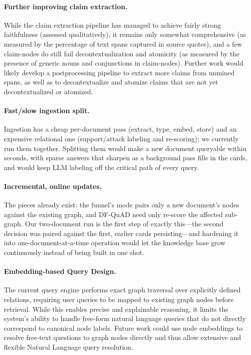 \documentclass{article}
\newcommand{\flag}[1]{\texttt{\seqsplit{#1}}}
\begin{document}
\paragraph{Further improving claim extraction.}
While the claim extraction pipeline has managed to achieve fairly strong faithfulness (assessed qualitatively), it remains only somewhat comprehensive (as measured by the percentage of text spans captured in source quotes), and a few claim-nodes do still fail decontextualization and atomicity (as measured by the presence of generic nouns and conjunctions in claim-nodes). Further work would likely develop a postprocessing pipeline to extract more claims from unmined spans, as well as to decontextualize and atomize claims that are not yet decontextualized or atomized.
\paragraph{Fast/slow ingestion split.}
Ingestion has a cheap per-document pass (extract, type, embed, store) and an
expensive relational one (support/attack labeling and re-scoring); we
currently run them together. Splitting them would make a new document
queryable within seconds, with sparse answers that sharpen as a background
pass fills in the cards, and would keep LLM labeling off the critical path of
every query.
\paragraph{Incremental, online updates.}
The pieces already exist: the funnel's \flag{--new-nodes} mode pairs only
a new document's nodes against the existing graph, and DF-QuAD need only
re-score the affected sub-graph. Our two-document run is the first step of
exactly this---the second decision was paired against the first, earlier cards
persisting---and hardening it into one-document-at-a-time operation would let
the knowledge base grow continuously instead of being built in one shot.

\paragraph{Embedding-based Query Design.}
The current query engine performs exact graph traversal over explicitly defined relations, requiring user queries to be mapped to existing graph nodes before retrieval. While this enables precise and explainable reasoning, it limits the system's ability to handle free-form natural language queries that do not directly correspond to canonical node labels. Future work could use node embeddings to resolve free-text questions to graph nodes directly and thus allow extensive and flexible Natural Language query resolution.
\end{document}
